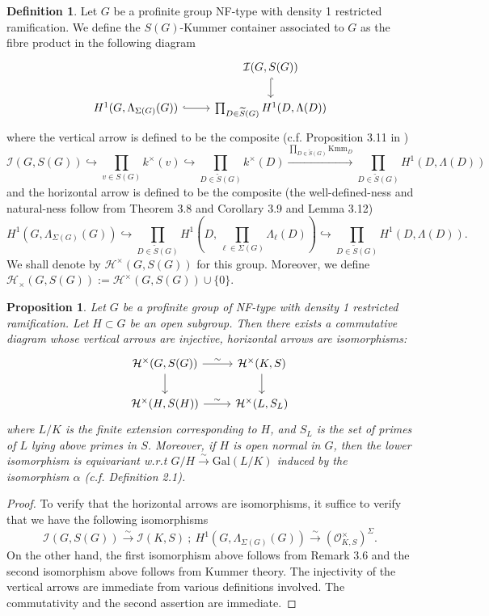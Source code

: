 \documentclass{article}
\theoremstyle{plain}
\newtheorem{prop}[thm]{Proposition}
\theoremstyle{definition}
\newtheorem{defn}[thm]{Definition}
\theoremstyle{remark}
\begin{document}
\begin{defn}
Let $G$ be a profinite group NF-type with density 1 restricted ramification. We define the $S(G)$-Kummer container associated to $G$ as the fibre product in the following diagram
$$
\begin{tikzcd}
    & \mathcal{I}(G,S(G)) \arrow[d,hookrightarrow] \\
    H^1(G,\Lambda_{\Sigma(G)}(G)) \arrow[r,hookrightarrow] & \prod_{D \in \widetilde{S}(G)} H^1(D,\Lambda(D))
\end{tikzcd}
$$
where the vertical arrow is defined to be the composite (c.f. Proposition 3.11 in \cite{Ho1})
$$
\mathcal{I}(G,S(G)) \hookrightarrow \prod_{v \in S(G)} k^{\times}(v) \hookrightarrow \prod_{D \in \widetilde{S}(G)} k^{\times}(D) \xrightarrow{\prod_{D \in \widetilde{S}(G)}\text{Kmm}_D} \prod_{D \in \widetilde{S}(G)} H^1(D,\Lambda(D))
$$
and the horizontal arrow is defined to be the composite (the well-defined-ness and natural-ness follow from Theorem 3.8 and Corollary 3.9 and Lemma 3.12)
$$
H^1(G,\Lambda_{\Sigma(G)}(G)) \hookrightarrow \prod_{D\in \widetilde{S}(G)} H^1(D,\prod_{\ell \in \Sigma(G)}\Lambda_{\ell}(D)) \hookrightarrow \prod_{D \in \widetilde{S}(G)}H^1(D,\Lambda(D)).
$$
We shall denote by $\mathcal{H}^{\times}(G,S(G))$ for this group. Moreover, we define $\mathcal{H}_{\times}(G,S(G)) := \mathcal{H}^{\times}(G,S(G)) \cup \{0\}$.
\end{defn}

\begin{prop}
Let $G$ be a profinite group of NF-type with density 1 restricted ramification. Let $H\subset G$ be an open subgroup. Then there exists a commutative diagram whose vertical arrows are injective, horizontal arrows are isomorphisms:
$$
\begin{tikzcd}
	{\mathcal{H}^{\times}(G,S(G))} & {\mathcal{H}^{\times}(K,S)} \\
	{\mathcal{H}^{\times}(H,S(H))} & {\mathcal{H}^{\times}(L,S_L)}
	\arrow["\sim", from=1-1, to=1-2]
	\arrow[from=1-1, to=2-1]
	\arrow[from=1-2, to=2-2]
	\arrow["\sim", from=2-1, to=2-2]
\end{tikzcd}
$$
where $L/K$ is the finite extension corresponding to $H$, and $S_L$ is the set of primes of $L$ lying above primes in $S$. Moreover, if $H$ is open normal in $G$, then the lower isomorphism is equivariant w.r.t $G/H \xrightarrow{\sim} \text{Gal}(L/K)$ induced by the isomorphism $\alpha$ (c.f. Definition 2.1).
\end{prop}
\begin{proof}
To verify that the horizontal arrows are isomorphisms, it suffice to verify that we have the following isomorphisms
$$
\mathcal{I}(G,S(G)) \xrightarrow{\sim} \mathcal{I}(K,S)~;~H^1(G,\Lambda_{\Sigma(G)}(G)) \xrightarrow{\sim} (\mathcal{O}_{K,S}^{\times})^{\Sigma}.
$$
On the other hand, the first isomorphism above follows from Remark 3.6 and the second isomorphism above follows from Kummer theory. The injectivity of the vertical arrows are immediate from various definitions involved. The commutativity and the second assertion are immediate.
\end{proof}
\end{document}
